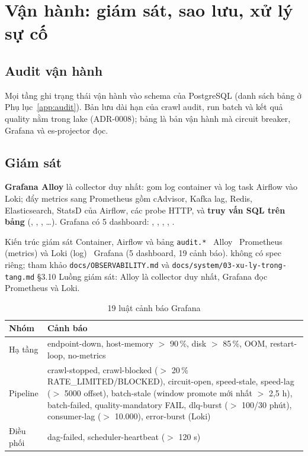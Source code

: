 \chapter{Vận hành: giám sát, sao lưu, xử lý sự cố}\label{chap:ops}

\section{Audit vận hành}
Mọi tầng ghi trạng thái vận hành vào schema  của PostgreSQL (danh sách bảng ở Phụ lục~\ref{app:audit}).
Bản lưu dài hạn của crawl audit, run batch và kết quả quality nằm trong lake (ADR-0008); bảng  là bản vận hành
mà circuit breaker, Grafana và es-projector đọc.

\section{Giám sát}
\textbf{Grafana Alloy} là collector duy nhất: gom log container và log task Airflow vào Loki; đẩy metrics sang Prometheus gồm cAdvisor,
Kafka lag, Redis, Elasticsearch, StatsD của Airflow, các probe HTTP, và \textbf{truy vấn SQL trên bảng }
(, , , \ldots). Grafana có 5 dashboard:
, , , , .

  {Kiến trúc giám sát}
  {Container, Airflow và bảng \texttt{audit.*} \ra\ Alloy \ra\ Prometheus (metrics) và Loki (log) \ra\ Grafana (5 dashboard, 19 cảnh báo).}
  {không có spec riêng; tham khảo \texttt{docs/OBSERVABILITY.md} và \texttt{docs/system/03-xu-ly-trong-tang.md} §3.10}
  {Luồng giám sát: Alloy là collector duy nhất, Grafana đọc Prometheus và Loki.}

\begin{xltabular}{\linewidth}{@{}L{24mm}Y@{}}
  \caption{19 luật cảnh báo Grafana}\label{tab:alerts}\\
  \toprule
  \textbf{Nhóm} & \textbf{Cảnh báo} \\
  \midrule
  Hạ tầng & endpoint-down, host-memory $>$ 90\,\%, disk $>$ 85\,\%, OOM, restart-loop, no-metrics \\
  Pipeline & crawl-stopped, crawl-blocked ($>$ 20\,\% RATE\_LIMITED/BLOCKED), circuit-open, speed-stale, speed-lag ($>$ 5000 offset),
             batch-stale (window promote mới nhất $>$ 2,5 h), batch-failed, quality-mandatory FAIL, dlq-burst ($>$ 100/30 phút),
             consumer-lag ($>$ 10.000), error-burst (Loki) \\
  Điều phối & dag-failed, scheduler-heartbeat ($>$ 120 s) \\
  \bottomrule
\end{xltabular}

